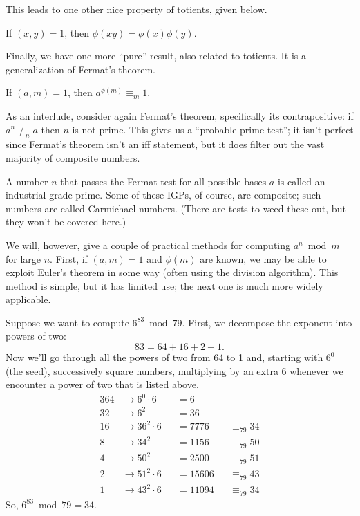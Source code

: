 \documentclass[../m55main.tex]{subfiles}
\begin{document}
This leads to one other nice property of totients, given below.

\begin{corollary}
    If $(x,y) = 1$, then $\phi (xy) = \phi (x) \phi (y)$.
\end{corollary}

Finally, we have one more ``pure'' result, also related to totients.
It is a generalization of Fermat's theorem.

\begin{theorem}
    If $(a,m) = 1$, then $a^{\phi (m)} \equiv_m 1$.
\end{theorem}


As an interlude, consider again Fermat's theorem, specifically its contrapositive: if $a^n \not\equiv_n a$ then $n$ is not prime.
This gives us a ``probable prime test''; it isn't perfect since Fermat's theorem isn't an iff statement, but it does filter out the vast majority of composite numbers.

A number $n$ that passes the Fermat test for all possible bases $a$ is called an industrial-grade prime.
Some of these IGPs, of course, are composite; such numbers are called Carmichael numbers.
(There are tests to weed these out, but they won't be covered here.)

We will, however, give a couple of practical methods for computing $a^n \bmod m$ for large $n$.
First, if $(a,m) = 1$ and $\phi (m)$ are known, we may be able to exploit Euler's theorem in some way (often using the division algorithm).
This method is simple, but it has limited use; the next one is much more widely applicable.

\begin{example}
    Suppose we want to compute $6^{83} \bmod 79$.
    First, we decompose the exponent into powers of two:
    \[ 83 = 64 + 16 + 2 + 1. \]
    Now we'll go through all the powers of two from 64 to 1 and, starting with $6^0$ (the seed), successively square numbers, multiplying by an extra 6 whenever we encounter a power of two that is listed above.
    \begin{alignat*}{3}
        \boxed{64} &\rightarrow 6^0 \cdot 6 &&= 6 \\
        32 &\rightarrow 6^2 &&= 36 \\
        \boxed{16} &\rightarrow 36^2 \cdot 6 &&= 7776 &&\equiv_{79} 34 \\
        8 &\rightarrow 34^2 &&= 1156 &&\equiv_{79} 50 \\
        4 &\rightarrow 50^2 &&= 2500 &&\equiv_{79} 51 \\
        \boxed{2} &\rightarrow 51^2 \cdot 6 &&= 15606 &&\equiv_{79} 43 \\
        \boxed{1} &\rightarrow 43^2 \cdot 6 &&= 11094 &&\equiv_{79} 34
    \end{alignat*}
    So, $6^{83} \bmod 79 = 34$.
\end{example}
\end{document}
